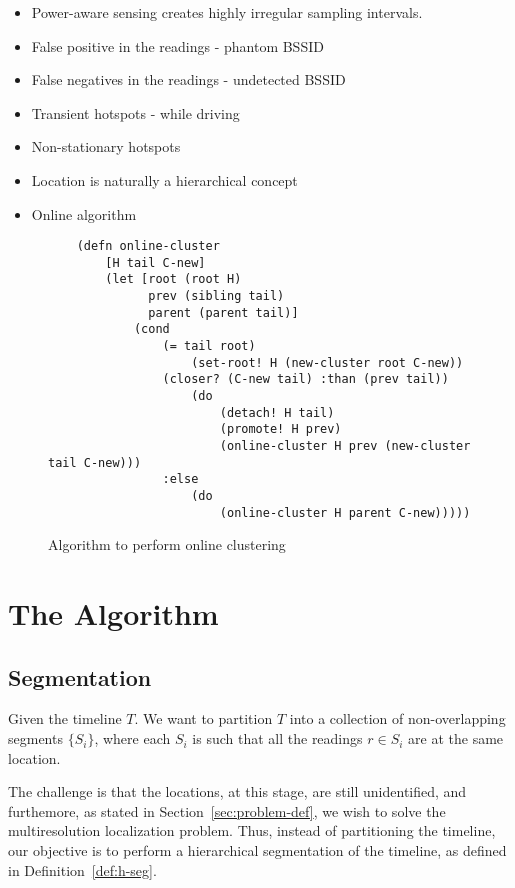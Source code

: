 \begin{itemize}
    \item Power-aware sensing creates highly irregular sampling intervals.
    \item False positive in the readings - phantom BSSID
    \item False negatives in the readings - undetected BSSID
    \item Transient hotspots - while driving
    \item Non-stationary hotspots
    \item Location is naturally a hierarchical concept
    \item Online algorithm
\end{itemize}


\begin{figure*}
    \begin{verbatim}
    (defn online-cluster
        [H tail C-new]
        (let [root (root H)
              prev (sibling tail)
              parent (parent tail)]
            (cond
                (= tail root)
                    (set-root! H (new-cluster root C-new))
                (closer? (C-new tail) :than (prev tail))
                    (do
                        (detach! H tail)
                        (promote! H prev)
                        (online-cluster H prev (new-cluster tail C-new)))
                :else
                    (do
                        (online-cluster H parent C-new)))))
    \end{verbatim}
\caption{Algorithm to perform online clustering}
\end{figure*}

\section{The Algorithm}

\subsection{Segmentation}

Given the timeline $T$. We want to partition $T$ into a collection of
non-overlapping segments $\{S_i\}$, where each $S_i$ is such that all the
readings $r\in S_i$ are at the same location.

The challenge is that the locations, at this stage, are still unidentified, and
furthemore, as stated in Section~\ref{sec:problem-def}, we wish to solve the
multiresolution localization problem.  Thus, instead of partitioning the
timeline, our objective is to perform a hierarchical segmentation of the
timeline, as defined in Definition~\ref{def:h-seg}.

